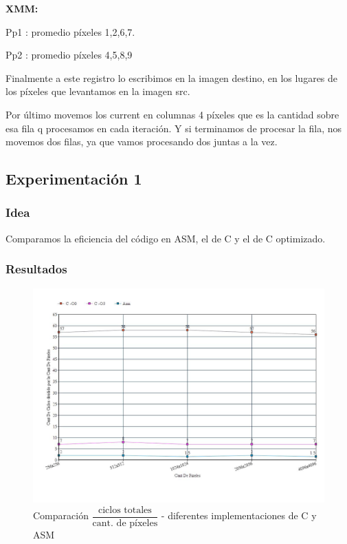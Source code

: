 \par{\textbf{XMM:}}
\par {Pp1 : promedio píxeles {1,2,6,7}.}
\par{Pp2 : promedio píxeles {4,5,8,9}}
	
\par{Finalmente a este registro lo escribimos en la imagen destino, en los lugares de los píxeles que levantamos en la imagen src.}
\par{Por último movemos los current en columnas 4 píxeles que es la cantidad sobre esa fila q procesamos en cada iteración. Y si terminamos de procesar la fila, nos movemos dos filas, ya que vamos procesando dos juntas a la vez.}
	
\subsection{Experimentación 1}
\subsubsection{Idea}	
\par{Comparamos la eficiencia del código en ASM, el de C y el de C optimizado.}
	
\subsubsection{Resultados}
	\begin{figure}[h!]
	\centering
	\includegraphics[width = 15 cm, height = 10 cm]{imagenes/pixeAsmC.jpg}
	\caption[center]{Comparación $\dfrac{\text{ciclos totales}}{\text{cant. de píxeles}}$ - diferentes implementaciones de C y ASM}
\end{figure}

